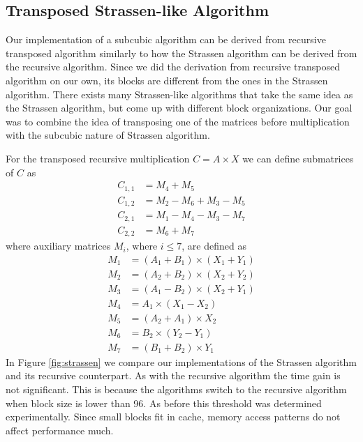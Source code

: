 \documentclass[a4paper,11pt]{article}
\begin{document}




\subsection{Transposed Strassen-like Algorithm}

Our implementation of a subcubic algorithm can be derived from recursive transposed algorithm similarly to how the Strassen algorithm can be derived from the recursive algorithm. 
Since we did the derivation from recursive transposed algorithm on our own, its blocks are different from the ones in the Strassen algorithm. There exists many Strassen-like algorithms that take the same idea as the Strassen algorithm, but come up with different block organizations. Our goal was to combine the idea of transposing one of the matrices before multiplication with the subcubic nature of Strassen algorithm.

For the transposed recursive multiplication $C = A \times X$ we can define submatrices of $C$ as
\begin{align*}
C_{1,1} &= M_{4} + M_{5}\\
C_{1,2} &= M_{2} - M_{6} + M_{3} - M_{5} \\
C_{2,1} &= M_{1} - M_{4} - M_{3} - M_{7} \\
C_{2,2} &= M_{6} + M_{7}
\end{align*}
where auxiliary matrices $M_{i}$, where $i \leq 7$, are defined as
\begin{align*}
M_{1} &= (A_{1} + B_{1}) \times (X_{1} + Y_{1}) \\
M_{2} &= (A_{2} + B_{2}) \times (X_{2} + Y_{2}) \\
M_{3} &= (A_{1} - B_{2}) \times (X_{2} + Y_{1}) \\
M_{4} &= A_{1} \times (X_{1} - X_{2}) \\
M_{5} &= (A_{2} + A_{1}) \times X_{2} \\
M_{6} &= B_{2} \times (Y_{2} - Y_{1}) \\
M_{7} &= (B_{1} + B_{2}) \times Y_{1}
\end{align*}
In Figure \ref{fig:strassen} we compare our implementations of the Strassen algorithm and its recursive counterpart. As with the recursive algorithm the time gain is not significant. This is because the algorithms switch to the recursive algorithm when block size is lower than 96. As before this threshold was determined experimentally. Since small blocks fit in cache, memory access patterns do not affect performance much.
\end{document}
